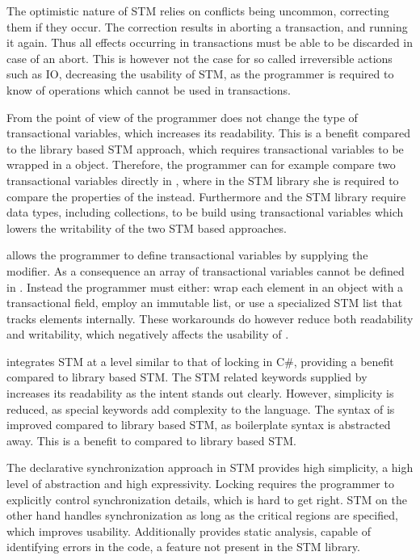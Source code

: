 The optimistic nature of \ac{STM} relies on conflicts being uncommon,  correcting them if they occur. The correction results in aborting a transaction, and running it again. Thus all effects occurring in transactions must be able to be discarded in case of an abort. This is however not the case for so called irreversible actions such as \ac{IO},  decreasing the usability of \ac{STM}, as the programmer is required to know of operations which cannot be used in transactions.

From the point of view of the programmer \stmname does not change the type of transactional variables, which increases its readability. This is a benefit compared to the library based \ac{STM} approach, which requires transactional variables to be wrapped in a  object. Therefore, the programmer can for example compare two transactional variables directly in \stmname, where in the \ac{STM} library she is required to compare the  properties of the  instead. Furthermore \stmname and the \ac{STM} library require data types, including collections, to be build using transactional variables which lowers the writability of the two \ac{STM} based approaches.  %

\stmname allows the programmer to define transactional variables by supplying the  modifier. As a consequence an array of transactional variables cannot be defined in \stmname. Instead the programmer must either: wrap each element in an object with a transactional field, employ an immutable list, or use a specialized \ac{STM} list that tracks elements internally. These workarounds do however reduce both readability and writability, which negatively affects the usability of \stmname.

\stmname integrates \ac{STM} at a level similar to that of locking in C\#, providing a benefit compared to library based \ac{STM}. The \ac{STM} related keywords supplied by \stmname increases its readability as the intent stands out clearly. However, simplicity is  reduced, as special keywords add complexity to the language. The syntax of \stmname is improved compared to library based \ac{STM}, as boilerplate syntax is abstracted away. This is a benefit to \stmname compared to library based \ac{STM}. 

The declarative synchronization approach in \ac{STM} provides high simplicity, a high level of abstraction and high expressivity. Locking requires the programmer to explicitly control synchronization details, which is hard to get right. \ac{STM} on the other hand handles synchronization as long as the critical regions are specified, which improves usability. Additionally \stmname provides static analysis, capable of identifying errors in the code, a feature not present in the \ac{STM} library. 

